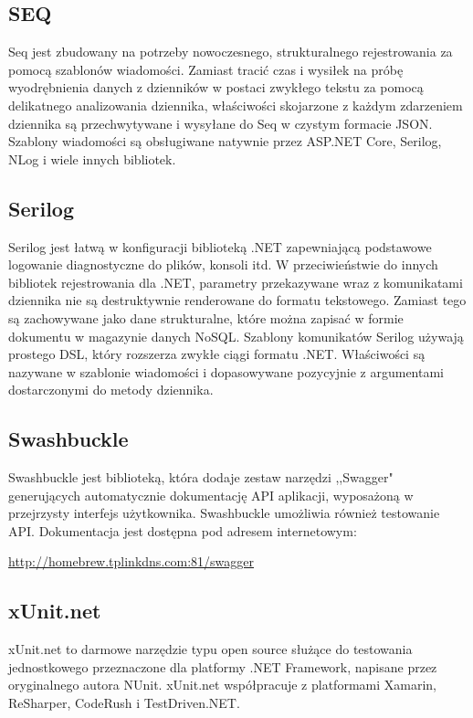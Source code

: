 \documentclass[12pt,a4paper]{article}
\begin{document}
		\subsection{SEQ}
			\indent Seq jest zbudowany na potrzeby nowoczesnego, strukturalnego rejestrowania za pomocą szablonów wiadomości. Zamiast tracić czas i wysiłek na próbę
				wyodrębnienia danych z dzienników w postaci zwykłego tekstu za pomocą delikatnego analizowania dziennika, właściwości skojarzone z każdym zdarzeniem
				dziennika są przechwytywane i wysyłane do Seq w czystym formacie JSON. Szablony wiadomości są obsługiwane natywnie przez ASP.NET Core, Serilog, NLog
				i wiele innych bibliotek. 

		\subsection{Serilog}
			\indent Serilog jest łatwą w konfiguracji biblioteką .NET zapewniającą podstawowe logowanie diagnostyczne do plików, konsoli itd. W przeciwieństwie do innych bibliotek
				rejestrowania dla .NET, parametry przekazywane wraz z komunikatami dziennika nie są destruktywnie renderowane do formatu tekstowego. Zamiast tego są zachowywane
				jako dane strukturalne, które można zapisać w formie dokumentu w magazynie danych NoSQL. Szablony komunikatów Serilog używają prostego DSL, który rozszerza
				zwykłe ciągi formatu .NET. Właściwości są nazywane w szablonie wiadomości i dopasowywane pozycyjnie z argumentami dostarczonymi do metody dziennika.

		\subsection{Swashbuckle}
			\indent Swashbuckle jest biblioteką, która dodaje zestaw narzędzi ,,Swagger" generujących automatycznie dokumentację API aplikacji,
				wyposażoną w przejrzysty interfejs użytkownika. Swashbuckle umożliwia również testowanie API. Dokumentacja jest dostępna pod adresem internetowym:
			\begin{tcolorbox}[minipage,colback=white,arc=0pt,outer arc=0pt, fontupper=\scriptsize]
				\center					
				\url{http://homebrew.tplinkdns.com:81/swagger}
			\end{tcolorbox}

		\subsection{xUnit.net}
			\indent xUnit.net to darmowe narzędzie typu open source służące do testowania jednostkowego
			przeznaczone dla platformy .NET Framework, napisane przez oryginalnego autora NUnit.
			xUnit.net współpracuje z platformami Xamarin, ReSharper, CodeRush i TestDriven.NET.
	
\end{document}
